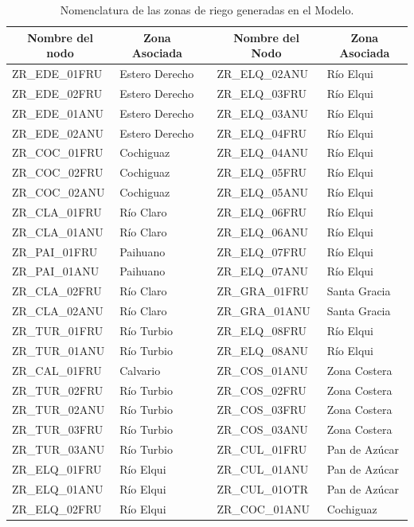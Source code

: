 \documentclass[11pt,]{article}
\begin{document}
\begin{table}[H]
\centering
\caption{Nomenclatura de las zonas de riego generadas en el Modelo.}
\label{tabla8}
\begin{tabular}{@{}lllll@{}}
\toprule
\multicolumn{1}{c}{\textbf{Nombre del nodo}} & \multicolumn{1}{c}{\textbf{Zona Asociada}} & \multicolumn{1}{c}{\textbf{}} & \multicolumn{1}{c}{\textbf{Nombre del Nodo}} & \multicolumn{1}{c}{\textbf{Zona Asociada}} \\ \midrule
ZR\_EDE\_01FRU & Estero Derecho &  & ZR\_ELQ\_02ANU & Río Elqui \\
ZR\_EDE\_02FRU & Estero Derecho &  & ZR\_ELQ\_03FRU & Río Elqui \\
ZR\_EDE\_01ANU & Estero Derecho &  & ZR\_ELQ\_03ANU & Río Elqui \\
ZR\_EDE\_02ANU & Estero Derecho &  & ZR\_ELQ\_04FRU & Río Elqui \\
ZR\_COC\_01FRU & Cochiguaz &  & ZR\_ELQ\_04ANU & Río Elqui \\
ZR\_COC\_02FRU & Cochiguaz &  & ZR\_ELQ\_05FRU & Río Elqui \\
ZR\_COC\_02ANU & Cochiguaz &  & ZR\_ELQ\_05ANU & Río Elqui \\
ZR\_CLA\_01FRU & Río Claro &  & ZR\_ELQ\_06FRU & Río Elqui \\
ZR\_CLA\_01ANU & Río Claro &  & ZR\_ELQ\_06ANU & Río Elqui \\
ZR\_PAI\_01FRU & Paihuano &  & ZR\_ELQ\_07FRU & Río Elqui \\
ZR\_PAI\_01ANU & Paihuano &  & ZR\_ELQ\_07ANU & Río Elqui \\
ZR\_CLA\_02FRU & Río Claro &  & ZR\_GRA\_01FRU & Santa Gracia \\
ZR\_CLA\_02ANU & Río Claro &  & ZR\_GRA\_01ANU & Santa Gracia \\
ZR\_TUR\_01FRU & Río Turbio &  & ZR\_ELQ\_08FRU & Río Elqui \\
ZR\_TUR\_01ANU & Río Turbio &  & ZR\_ELQ\_08ANU & Río Elqui \\
ZR\_CAL\_01FRU & Calvario &  & ZR\_COS\_01ANU & Zona Costera \\
ZR\_TUR\_02FRU & Río Turbio &  & ZR\_COS\_02FRU & Zona Costera \\
ZR\_TUR\_02ANU & Río Turbio &  & ZR\_COS\_03FRU & Zona Costera \\
ZR\_TUR\_03FRU & Río Turbio &  & ZR\_COS\_03ANU & Zona Costera \\
ZR\_TUR\_03ANU & Río Turbio &  & ZR\_CUL\_01FRU & Pan de Azúcar \\
ZR\_ELQ\_01FRU & Río Elqui &  & ZR\_CUL\_01ANU & Pan de Azúcar \\
ZR\_ELQ\_01ANU & Río Elqui &  & ZR\_CUL\_01OTR & Pan de Azúcar \\
ZR\_ELQ\_02FRU & Río Elqui &  & ZR\_COC\_01ANU & Cochiguaz \\ \bottomrule
\end{tabular}
\end{table}
\end{document}
